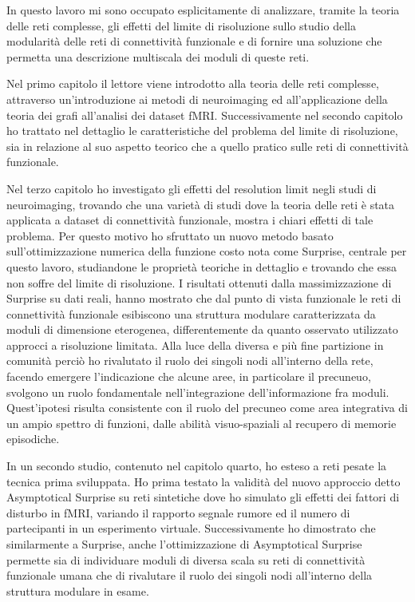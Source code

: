 In questo lavoro mi sono occupato esplicitamente di analizzare, tramite la teoria delle reti complesse, gli effetti del limite di risoluzione sullo studio della modularità delle reti di connettività funzionale e di fornire una soluzione che permetta una descrizione multiscala dei moduli di queste reti.

Nel primo capitolo il lettore viene introdotto alla teoria delle reti complesse, attraverso un'introduzione ai metodi di neuroimaging ed all'applicazione della teoria dei grafi all'analisi dei dataset fMRI.
Successivamente nel secondo capitolo ho trattato nel dettaglio le caratteristiche del problema del limite di risoluzione, sia in relazione al suo aspetto teorico che a quello pratico sulle reti di connettività funzionale.

Nel terzo capitolo ho investigato gli effetti del resolution limit negli studi di neuroimaging, trovando che una varietà di studi dove la teoria delle reti è stata applicata a dataset di connettività funzionale, mostra i chiari effetti di tale problema.
Per questo motivo ho sfruttato un nuovo metodo basato sull'ottimizzazione numerica della funzione costo nota come Surprise, centrale per questo lavoro, studiandone le proprietà teoriche in dettaglio e trovando che essa non soffre del limite di risoluzione.
I risultati ottenuti dalla massimizzazione di Surprise su dati reali, hanno mostrato che dal punto di vista funzionale le reti di connettività funzionale esibiscono una struttura modulare caratterizzata da moduli di dimensione eterogenea, differentemente da quanto osservato utilizzato approcci a risoluzione limitata.
Alla luce della diversa e più fine partizione in comunità perciò ho rivalutato il ruolo dei singoli nodi all'interno della rete, facendo emergere l'indicazione che alcune aree, in particolare il precuneuo, svolgono un ruolo fondamentale nell'integrazione dell'informazione fra moduli. Quest'ipotesi risulta consistente con il ruolo del precuneo come area integrativa di un ampio spettro di funzioni, dalle abilità visuo-spaziali al recupero di memorie episodiche.

In un secondo studio, contenuto nel capitolo quarto, ho esteso a reti pesate la tecnica prima sviluppata.
Ho prima testato la validità del nuovo approccio detto Asymptotical Surprise su reti sintetiche dove ho simulato gli effetti dei fattori di disturbo in fMRI, variando il rapporto segnale rumore ed il numero di partecipanti in un esperimento virtuale.
Successivamente ho dimostrato che similarmente a Surprise, anche l'ottimizzazione di Asymptotical Surprise permette sia di individuare moduli di diversa scala su reti di connettività funzionale umana che di rivalutare il ruolo dei singoli nodi all'interno della struttura modulare in esame.

